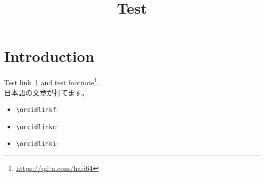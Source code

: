 \documentclass[11pt, dvipdfmx]{article}
\begin{document}
\title{Test}

\author[1]{}
\date{}

\maketitle

\section{Introduction}\label{sec:introduction}

Test link~\ref{sec:introduction} and test footnote\footnote{\url{https://qiita.com/hari64}}.\\
日本語の文章が打てます。

\begin{itemize}
    \item \verb|\orcidlinkf|: \\ 
    \item \verb|\orcidlinkc|: 
    \item \verb|\orcidlinki|: 
\end{itemize}
\end{document}
